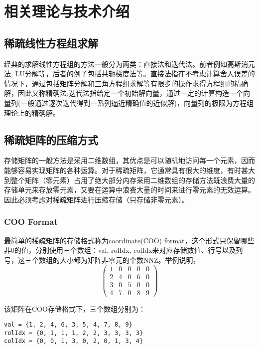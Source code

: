 \chapter{相关理论与技术介绍}

\section{稀疏线性方程组求解}

经典的求解线性方程组的方法一般分为两类：直接法和迭代法。前者例如高斯消元法, LU分解等，后者的例子包括共轭梯度法等。直接法指在不考虑计算舍入误差的情况下，通过包括矩阵分解和三角方程组求解等有限步的操作求得方程组的精确解，因此又称精确法;迭代法指给定一个初始解向量，通过一定的计算构造一个向量列(一般通过逐次迭代得到一系列逼近精确值的近似解)，向量列的极限为方程组理论上的精确解。

\section{稀疏矩阵的压缩方式}

存储矩阵的一般方法是采用二维数组，其优点是可以随机地访问每一个元素，因而能够容易实现矩阵的各种运算。对于稀疏矩阵，它通常具有很大的维度，有时甚大到整个矩阵（零元素）占用了绝大部分内存采用二维数组的存储方法既浪费大量的存储单元来存放零元素，又要在运算中浪费大量的时间来进行零元素的无效运算。因此必须考虑对稀疏矩阵进行压缩存储（只存储非零元素）。

\subsection{COO Format}

最简单的稀疏矩阵的存储格式称为coordinate(COO) format，这个形式只保留哪些非0的值，分别使用三个数组：val, rolIdx, colIdx来对应存储数值、行号以及列号，这三个数组的大小都为矩阵非零元的个数NNZ。举例说明，
$$
\begin{pmatrix}
    \label{稀疏矩阵例子}
    1 & 0 & 0 & 0 & 0 \\
    2 & 4 & 0 & 6 & 0 \\
    3 & 0 & 5 & 0 & 0 \\
    4 & 7 & 0 & 8 & 9
\end{pmatrix}
$$

该矩阵在COO存储格式下，三个数组分别为：
\begin{lstlisting}[title=COO Format, frame=single]
val = {1, 2, 4, 6, 3, 5, 4, 7, 8, 9}
rolIdx = {0, 1, 1, 1, 2, 2, 3, 3, 3, 3}
colIdx = {0, 0, 1, 3, 0, 2, 0, 1, 3, 4}
\end{lstlisting}

